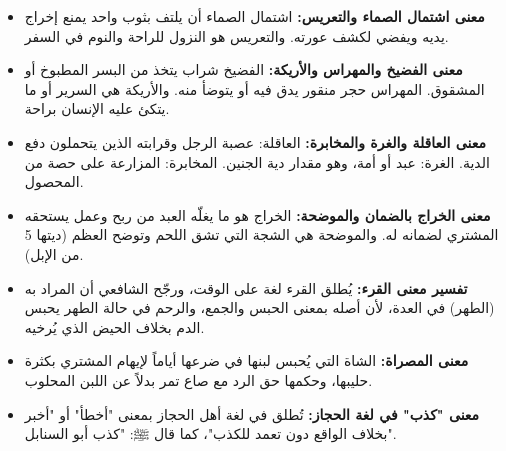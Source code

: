 \begin{itemize}
    \item \textbf{معنى اشتمال الصماء والتعريس:} اشتمال الصماء أن يلتف بثوب واحد يمنع إخراج يديه ويفضي لكشف عورته. والتعريس هو النزول للراحة والنوم في السفر.
    \item \textbf{معنى الفضيخ والمهراس والأريكة:} الفضيخ شراب يتخذ من البسر المطبوخ أو المشقوق. المهراس حجر منقور يدق فيه أو يتوضأ منه. والأريكة هي السرير أو ما يتكئ عليه الإنسان براحة.
    \item \textbf{معنى العاقلة والغرة والمخابرة:} العاقلة: عصبة الرجل وقرابته الذين يتحملون دفع الدية. الغرة: عبد أو أمة، وهو مقدار دية الجنين. المخابرة: المزارعة على حصة من المحصول.
    \item \textbf{معنى الخراج بالضمان والموضحة:} الخراج هو ما يغلّه العبد من ربح وعمل يستحقه المشتري لضمانه له. والموضحة هي الشجة التي تشق اللحم وتوضح العظم (ديتها 5 من الإبل).
    \item \textbf{تفسير معنى القرء:} يُطلق القرء لغة على الوقت، ورجّح الشافعي أن المراد به (الطهر) في العدة، لأن أصله بمعنى الحبس والجمع، والرحم في حالة الطهر يحبس الدم بخلاف الحيض الذي يُرخيه.
    \item \textbf{معنى المصراة:} الشاة التي يُحبس لبنها في ضرعها أياماً لإيهام المشتري بكثرة حليبها، وحكمها حق الرد مع صاع تمر بدلاً عن اللبن المحلوب.
    \item \textbf{معنى "كذب" في لغة الحجاز:} تُطلق في لغة أهل الحجاز بمعنى "أخطأ" أو "أخبر بخلاف الواقع دون تعمد للكذب"، كما قال ﷺ: "كذب أبو السنابل".
\end{itemize}

